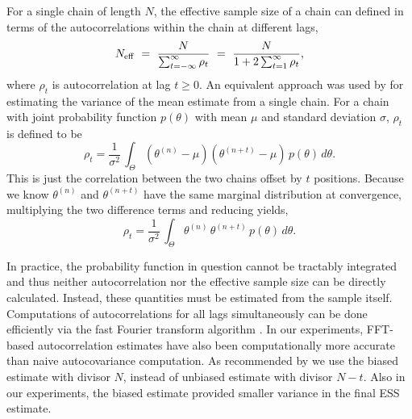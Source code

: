 \documentclass[american,]{article}
\theoremstyle{definition}
\begin{document}
For a single chain of length $N$, the effective sample size of a
chain can defined in terms of the autocorrelations within the chain at
different lags,
\begin{equation}
N_{\rm eff} \ = \
\frac{N}{\sum_{t = -\infty}^{\infty} \rho_t} \ = \
\frac{N}{1 + 2 \sum_{t = 1}^{\infty} \rho_t},
\end{equation}
where \(\rho_t\) is autocorrelation at lag \(t \geq 0\).  An
equivalent approach was used by \citet{Hastings:1970} for
estimating the variance of the mean estimate from a single chain. For a chain
with joint probability function \(p(\theta)\) with mean \(\mu\) and
standard deviation \(\sigma\), \(\rho_t\) is defined to be
\begin{equation}
\rho_t = \frac{1}{\sigma^2} \, \int_{\Theta} (\theta^{(n)} - \mu)
(\theta^{(n+t)} - \mu) \, p(\theta) \, d \theta.
\end{equation}
This is just the correlation between the two chains offset by \(t\)
positions. Because we know \(\theta^{(n)}\) and \(\theta^{(n+t)}\) have
the same marginal distribution at convergence, multiplying the two
difference terms and reducing yields,
\begin{equation}
\rho_t = \frac{1}{\sigma^2} \, \int_{\Theta} \theta^{(n)} \, \theta^{(n+t)}
\, p(\theta) \, d \theta.
\end{equation}

In practice, the probability function in question cannot be tractably
integrated and thus neither autocorrelation nor the effective sample
size can be directly calculated. Instead, these quantities must be
estimated from the sample itself.
%
Computations of autocorrelations for all lags simultaneously can be
done efficiently via the fast Fourier transform algorithm \citep[FFT;
see][]{Geyer:2011}. In our experiments, FFT-based autocorrelation
estimates have also been computationally more accurate than naive
autocovariance computation. As recommended by \citet{Geyer:1992} we
use the biased estimate with divisor $N$, instead of unbiased
estimate with divisor $N-t$. Also in our experiments, the biased
estimate provided smaller variance in the final ESS estimate.
\end{document}
